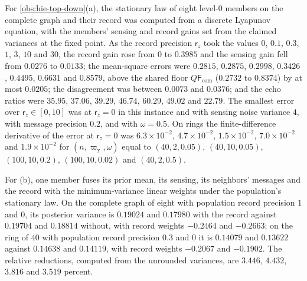 \begin{numcheck}\label{chk:hie-balance}
For \cref{obs:hie-top-down}(a), the stationary law of eight level-0 members on the complete graph and their record was computed from a discrete Lyapunov equation, with the members' sensing and record gains set from the claimed variances at the fixed point. As the record precision $\mathsf r_z$ took the values $0$, $0.1$, $0.3$, $1$, $3$, $10$ and $30$, the record gain rose from $0$ to $0.3985$ and the sensing gain fell from $0.0276$ to $0.0133$; the mean-square errors were $0.2815$, $0.2875$, $0.2998$, $0.3426$, $0.4495$, $0.6631$ and $0.8579$, above the shared floor $Q\mathsf F_{\mathrm{com}}$ ($0.2732$ to $0.8374$) by at most $0.0205$; the disagreement was between $0.0073$ and $0.0376$; and the echo ratios were $35.95$, $37.06$, $39.29$, $46.74$, $60.29$, $49.02$ and $22.79$. The smallest error over $\mathsf r_z\in[0,10]$ was at $\mathsf r_z=0$ in this instance and with sensing noise variance $4$, with message precision $0.2$, and with $\omega=0.5$. On rings the finite-difference derivative of the error at $\mathsf r_z=0$ was $6.3\times10^{-2}$, $4.7\times10^{-2}$, $1.5\times10^{-2}$, $7.0\times10^{-2}$ and $1.9\times10^{-2}$ for $(n,\varpi_{\mathrm y},\omega)$ equal to $(40,2,0.05)$, $(40,10,0.05)$, $(100,10,0.2)$, $(100,10,0.02)$ and $(40,2,0.5)$.

For (b), one member fuses its prior mean, its sensing, its neighbors' messages and the record with the minimum-variance linear weights under the population's stationary law. On the complete graph of eight with population record precision $1$ and $0$, its posterior variance is $0.19024$ and $0.17980$ with the record against $0.19704$ and $0.18814$ without, with record weights $-0.2464$ and $-0.2663$; on the ring of $40$ with population record precision $0.3$ and $0$ it is $0.14079$ and $0.13622$ against $0.14638$ and $0.14119$, with record weights $-0.2067$ and $-0.1902$. The relative reductions, computed from the unrounded variances, are $3.446$, $4.432$, $3.816$ and $3.519$ percent.


\end{numcheck}
